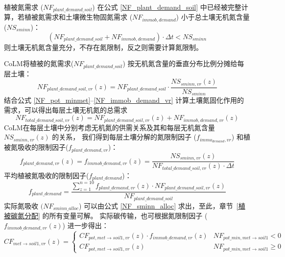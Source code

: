 植被氮需求 ($NF_{plant\_{demand\_{soil}}}$) 在公式 \eqref{NF_plant_demand_soil} 中已经被完整计算，若植被氮需求和土壤微生物固氮需求 ($NF_{immob,demand}$) 小于总土壤无机氮含量(${NS}_{sminn}$)：
\begin{equation}
    \left(NF_{plant\_{demand\_{soil}}}+NF_{immob,demand}\right)\cdot\Delta t<NS_{sminn}
\end{equation}
则土壤无机氮含量充分，不存在氮限制，反之则需要计算氮限制。

CoLM将植被的氮需求($NF_{plant\_{demand\_{soil}}}$) 按无机氮含量的垂直分布比例分摊给每层土壤：
\begin{equation}
    NF_{plant\_{demand\_{soil}},vr}(z)=NF_{plant\_{demand\_{soil}}}\cdot\frac{NS_{sminn,vr}(z)}{NS_{sminn}}
\end{equation}
结合公式 \eqref{NF_pot_minmet}--\eqref{NF_immob_demand_vr} 计算土壤氮固化作用的需求，可以得出每层土壤无机氮的总需求
\begin{equation}
    NF_{total\_{demand\_{soil}},vr}(z)=NF_{plant\_{demand\_{soil}},vr}(z)+NF_{immob,demand,vr}\left(z\right)
\end{equation}
CoLM在每层土壤中分别考虑无机氮的供需关系及其和每层无机氮含量 ${NS}_{sminn,vr}(z)$ 的关系，
我们得到每层土壤分解的氮限制因子 ($f_{immo_{demand},vr}$) 和植被氮吸收的限制因子($f_{plant\_{demand},vr}$)：
\begin{equation}
    f_{plant\_{demand},vr}(z)=f_{immob\_{demand},vr}(z)=\frac{NS_{sminn,vr}(z)}{NF_{total\_{demand\_{soil}},vr}(z)\cdot\Delta t}
\end{equation}
平均植被氮吸收的限制因子($f_{plant\_{demand}}$)：
\begin{equation}
    f_{plant\_{demand}}=\frac{\sum_{z=1}^{n=10}{f_{plant\_{demand},vr}(z)\cdot NF_{plant\_{demand\_{soil}},vr}(z)}}{NF_{plant\_{demand\_{soil}}}}
\end{equation}
实际氮吸收 $(NF_{sminn\_{alloc}}$) 可以由公式 \eqref{NF_sminn_alloc} 求出，至此，章节~\ref{植被碳氮分配} 的所有变量可解。
实际碳传输，也可根据氮限制因子 ($f_{immob\_{demand},vr}(z)$) 进一步得出：
\begin{equation}
CF_{met \rightarrow { soil1,vr }}(z)=\left\{\begin{array}{ll}C F_{pot, met \rightarrow soil1, vr}(z) \cdot f_{{immob}\_{demand}, vr}(z) & NF_{pot\_{min}, met \rightarrow {soil1}} <0 \\ 
CF_{pot, met \rightarrow { soil1,vr }}(z) & NF_{pot\_{min}, met \rightarrow {soil1}} \geq 0
\end{array}\right.
\end{equation}
